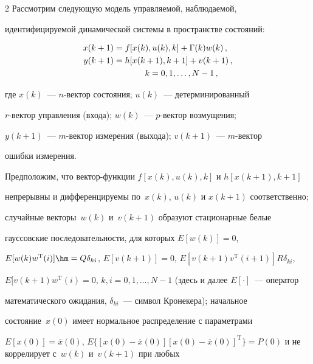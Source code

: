 \begin{multicols}{2}
  Рассмотрим следующую модель управляемой, наблюдаемой,


идентифицируемой динамической системы в пространстве состояний:





\noindent


  \begin{align}


  x(k+1)&=f[x(k),u(k),k]+\Gamma(k) w(k)\,,


  \label{e1-c}\\


  y(k+1) & =h[x(k+1),k+1]+v(k+1)\,,\notag\\


  &\hspace*{13mm} k=0, 1, \ldots , N-1\,,


  \label{e2-c}


  \end{align}


где $x(k)$~--- $n$-век\-тор состояния; $u(k)$~--- детерминированный


$r$-век\-тор управления (входа); $w(k)$~--- $p$-век\-тор возмущения;


$y(k+1)$~--- $m$-век\-тор измерения (выхода); $v(k+1)$~--- $m$-век\-тор


ошибки измерения.





  Предположим, что век\-тор-функ\-ции $f[x(k),u(k),k]$ и $h[x(k+1),k+1]$


непрерывны и дифференцируемы по~$x(k)$, $u(k)$ и $x(k+1)$ соответственно;


случайные векторы~$w(k)$ и~$v(k+1)$ образуют стационарные белые


гауссовские последовательности, для которых $E[w(k)]=0$,


$E[w(k)w^{\mathrm{T}}(i)]\hm =Q\delta_{ki}$, $E[v(k+1)]=0$, $E[v(k+1)v^{\mathrm{T}} (i+1)] R\delta_{ki}$,


$E[v(k+1) w^{\mathrm{T}}(i)=0$, $k,i=0, 1, \ldots , N-1$ (здесь и далее $E[\cdot]$~--- оператор


математического ожидания, $\delta_{ki}$~--- символ Кронекера); начальное


состояние~$x(0)$ имеет нормальное распределение с параметрами


$E[x(0)]=\overline{x}(0)$, $E\{[x(0)-\overline{x}(0)][x(0)-


\overline{x}(0)]^{\mathrm{T}}\}=P(0)$ и не коррелирует с~$w(k)$ и~$v(k+1)$ при любых



\end{multicols}
